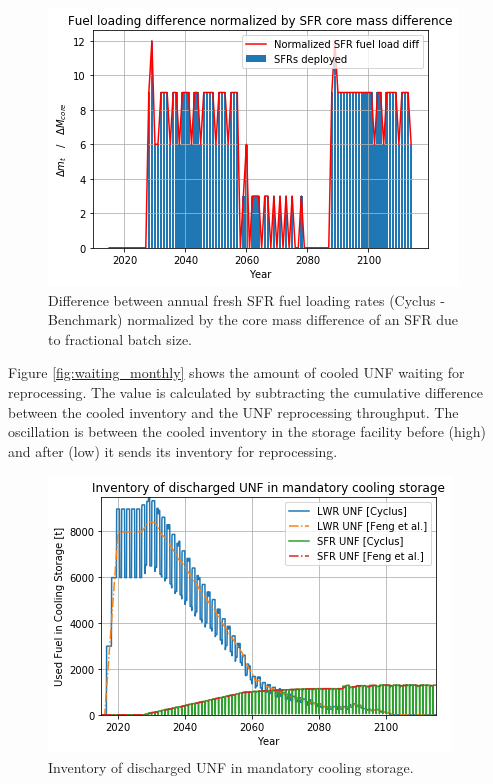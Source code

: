 \begin{figure}[htbp!]
    \begin{center}
        \includegraphics[scale=0.5]{./images/results_18/fuel_load_diff_norm.png}
    \end{center}
        \caption{Difference between annual fresh \gls{SFR} fuel loading rates (Cyclus - Benchmark) normalized by the core mass difference of an \gls{SFR} due to fractional batch size.}
    \label{fig:fuel_load_diff_norm}
\end{figure}


Figure \ref{fig:waiting_monthly} shows the amount of cooled \gls{UNF} waiting for
reprocessing. The value is calculated by subtracting the cumulative difference between
the cooled inventory and the \gls{UNF} reprocessing throughput.
The oscillation is between the cooled inventory in the storage facility before (high)
and after (low) it sends its inventory for reprocessing.

\begin{figure}[htbp!]
    \begin{center}
        \includegraphics[scale=0.5]{./images/results_18/fuel_discharge_monthly.png}
    \end{center}
        \caption{Inventory of discharged \gls{UNF} in mandatory cooling storage.}
    \label{fig:fuel_discharge_monthly}
\end{figure}



